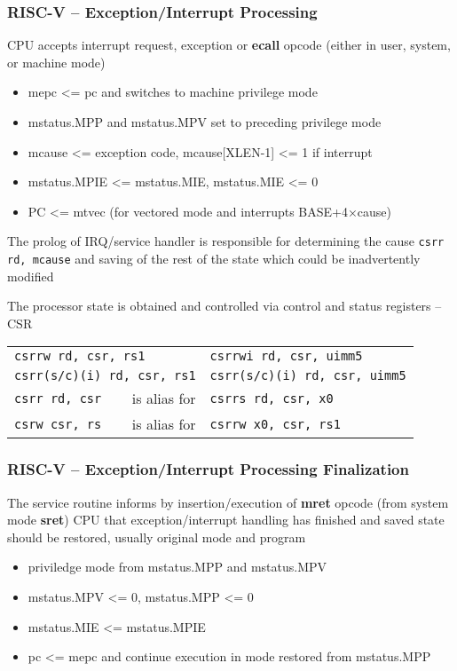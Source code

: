 \documentclass{beamer}
\begin{document}
\begin{frame}
\frametitle{RISC-V -- Exception/Interrupt Processing}

CPU accepts interrupt request, exception or \textbf{ecall} opcode (either in user, system, or machine mode)

\begin{itemize}
 \item mepc <= pc and switches to machine privilege mode
 \item mstatus.MPP and mstatus.MPV set to preceding privilege mode
 \item mcause <= exception code, mcause[XLEN-1] <= 1 if interrupt
 \item mstatus.MPIE <= mstatus.MIE, mstatus.MIE <= 0
 \item PC <= mtvec (for vectored mode and interrupts BASE+4×cause)
\end{itemize}

The prolog of IRQ/service handler is responsible for determining
the cause \texttt{csrr rd, mcause} and saving of the rest of
the state which could be inadvertently modified

The processor state is obtained and controlled via control and status registers -- CSR

\begin{tabular}{l r l}
\multicolumn{2}{l}{\texttt{csrrw rd, csr, rs1}} & \texttt{csrrwi rd, csr, uimm5} \\
\multicolumn{2}{l}{\texttt{csrr(s/c)(i) rd, csr, rs1}}  & \texttt{csrr(s/c)(i) rd, csr, uimm5} \\
\texttt{csrr rd, csr} &  is alias for  & \texttt{csrrs rd, csr, x0} \\
\texttt{csrw csr, rs} &  is alias for & \texttt{csrrw x0, csr, rs1} \\
\end{tabular}
\end{frame}

\begin{frame}
\frametitle{RISC-V -- Exception/Interrupt Processing Finalization}

The service routine informs by insertion/execution of \textbf{mret} opcode (from system mode \textbf{sret})
CPU that exception/interrupt handling has finished and saved state should be restored, usually original
mode and program

\begin{itemize}
 \item priviledge mode from mstatus.MPP and mstatus.MPV
 \item mstatus.MPV <= 0, mstatus.MPP <= 0
 \item mstatus.MIE <= mstatus.MPIE
 \item pc <= mepc and continue execution in mode restored from mstatus.MPP
\end{itemize}
\end{frame}
\end{document}
